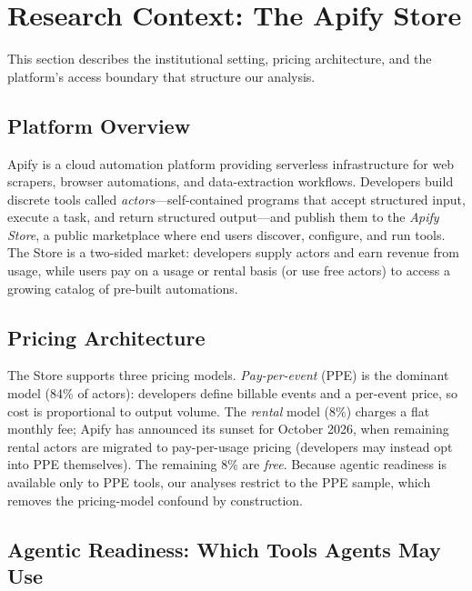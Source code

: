 \section{Research Context: The Apify Store}
\label{sec:context}

This section describes the institutional setting, pricing architecture, and the
platform's access boundary that structure our analysis.

\subsection{Platform Overview}

Apify is a cloud automation platform providing serverless infrastructure for
web scrapers, browser automations, and data-extraction workflows. Developers
build discrete tools called \emph{actors}---self-contained programs that accept
structured input, execute a task, and return structured output---and publish
them to the \emph{Apify Store}, a public marketplace where end users discover,
configure, and run tools. The Store is a two-sided market: developers supply
actors and earn revenue from usage, while users pay on a usage or rental basis
(or use free actors) to access a growing catalog of pre-built automations.

\subsection{Pricing Architecture}

The Store supports three pricing models. \emph{Pay-per-event} (PPE) is the
dominant model (84\% of actors): developers define billable events and a
per-event price, so cost is proportional to output volume. The \emph{rental}
model (8\%) charges a flat monthly fee; Apify has announced its sunset for
October 2026, when remaining rental actors are migrated to pay-per-usage
pricing (developers may instead opt into PPE themselves). The remaining 8\% are
\emph{free}. Because agentic readiness is available only to PPE tools, our
analyses restrict to the PPE sample, which removes the pricing-model confound
by construction.

\subsection{Agentic Readiness: Which Tools Agents May Use}

